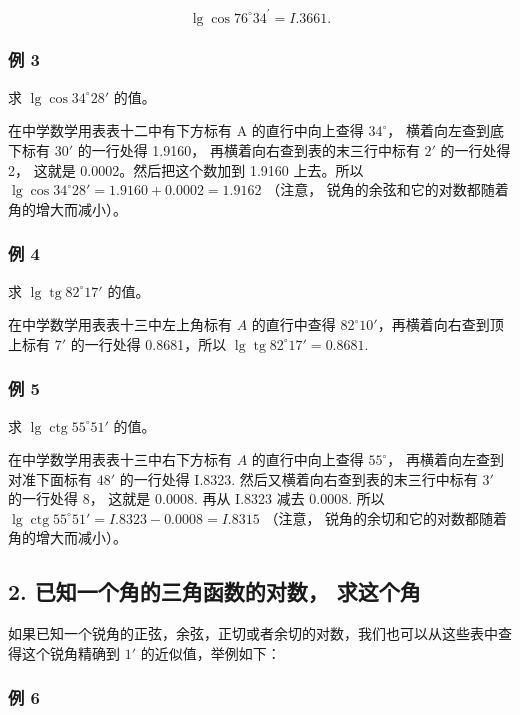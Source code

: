 \[
\lg \cos 76 ^{\circ} 34 ^{\prime} = I. 3661.
\]

\subsubsection{例 3}

求 \(\lg \cos 34^{\circ}28'\) 的值。

 在中学数学用表表十二中有下方标有 A 的直行中向上查得
\(34^{\circ}\)， 横着向左查到底下标有 \(30'\) 的一行处得 1.9160，
再横着向右查到表的末三行中标有 \(2'\) 的一行处得 2， 这就是
0.0002。然后把这个数加到 1.9160 上去。所以
\(\lg \cos 34^{\circ}28' = 1.9160 + 0.0002 = 1.9162\) （注意，
锐角的余弦和它的对数都随着角的增大而减小）。

\subsubsection{例 4}

求 \(\lg \operatorname{tg} 82^{\circ} 17'\) 的值。

 在中学数学用表表十三中左上角标有 \(A\) 的直行中查得
\(82^{\circ}10'\)，再横着向右查到顶上标有 \(7'\) 的一行处得 0.8681，所以
\(\lg \operatorname{tg} 82^{\circ}17' = 0.8681\).

\subsubsection{例 5}

求 \(\lg \operatorname{ctg} 55^{\circ}51'\) 的值。

 在中学数学用表表十三中右下方标有 \(A\) 的直行中向上查得
\(55^{\circ}\)， 再横着向左查到对准下面标有 \(48'\) 的一行处得 I.8323.
然后又横着向右查到表的末三行中标有 \(3'\) 的一行处得 8， 这就是 0.0008.
再从 I.8323 减去 0.0008. 所以
\(\lg \operatorname{ctg} 55^{\circ} 51' = I.8323 - 0.0008 = I.8315\)
（注意， 锐角的余切和它的对数都随着角的增大而减小）。

\subsection{2. 已知一个角的三角函数的对数， 求这个角}

如果已知一个锐角的正弦，余弦，正切或者余切的对数，我们也可以从这些表中查得这个锐角精确到
\(1'\) 的近似值，举例如下：

\subsubsection{例 6}

